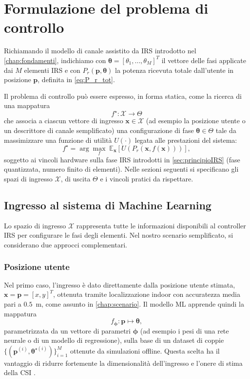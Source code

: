 \documentclass[12pt,a4paper]{report}
\begin{document}
\chapter{Formulazione del problema di controllo}
\label{chap:controlloIRS}

Richiamando il modello di canale assistito da IRS introdotto nel
\cref{chap:fondamenti}, indichiamo con $\boldsymbol{\theta} =
[\theta_1,\dots,\theta_M]^T$ il vettore delle fasi applicate dai $M$
elementi IRS e con $P_r(\mathbf{p}, \boldsymbol{\theta})$ la potenza
ricevuta totale dall'utente in posizione $\mathbf{p}$, definita in
\eqref{eq:P_r_tot}.

Il problema di controllo può essere espresso, in forma statica, come
la ricerca di una mappatura
\[
  f^{\star} : \mathcal{X} \rightarrow \mathcal{\Theta}
\]
che associa a ciascun vettore di ingresso $\mathbf{x} \in
\mathcal{X}$ (ad esempio la posizione utente o un descrittore di
canale semplificato) una configurazione di fase $\boldsymbol{\theta}
\in \mathcal{\Theta}$ tale da massimizzare una funzione di utilità
$U(\cdot)$ legata alle prestazioni del sistema:
\begin{equation}
  f^{\star} = \arg\max_{f} \;
  \mathbb{E}_{\mathbf{x}}
  \left[ U\!\left(P_r(\mathbf{x}, f(\mathbf{x}))\right) \right],
  \label{eq:problema_controllo}
\end{equation}
soggetto ai vincoli hardware sulla fase IRS introdotti in
\cref{sec:principioIRS} (fase quantizzata, numero finito di
elementi). Nelle sezioni seguenti si specificano gli spazi di
ingresso $\mathcal{X}$, di uscita $\mathcal{\Theta}$ e i vincoli
pratici da rispettare.

\section{Ingresso al sistema di Machine Learning}
Lo spazio di ingresso $\mathcal{X}$ rappresenta tutte le informazioni
disponibili al controller IRS per configurare le fasi degli elementi.
Nel nostro scenario semplificato, si considerano due approcci complementari.

\subsection{Posizione utente}
Nel primo caso, l'ingresso è dato direttamente dalla posizione utente
stimata, $\mathbf{x} = \mathbf{p} = [x, y]^T$, ottenuta tramite
localizzazione indoor con accuratezza media pari a $0.5$~m, come
assunto in \cref{chap:scenario}. Il modello ML apprende quindi la mappatura
\[
  f_{\boldsymbol{\phi}} : \mathbf{p} \mapsto \boldsymbol{\theta},
\]
parametrizzata da un vettore di parametri $\boldsymbol{\phi}$ (ad
esempio i pesi di una rete neurale o di un modello di regressione),
sulla base di un dataset di coppie $\{(\mathbf{p}^{(i)},
\boldsymbol{\theta}^{\star (i)})\}_{i=1}^M$ ottenute da simulazioni
offline. Questa scelta ha il vantaggio di ridurre fortemente la
dimensionalità dell'ingresso e l'onere di stima della CSI \cite{piroddi2023irs}.
\end{document}
